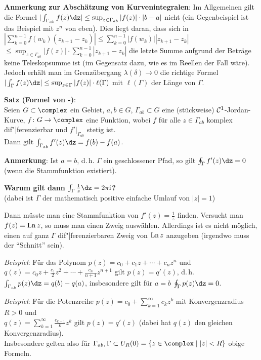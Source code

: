 \textbf{Anmerkung zur Abschätzung von Kurvenintegralen}:
Im Allgemeinen gilt die Formel
$|\int_{\Gamma_{ab}} f(z)\dz| \le \sup_{z \in \Gamma_{ab}} |f(z)| \cdot |b - a|$
nicht
(ein Gegenbeispiel ist das Beispiel mit $z^n$ von eben).
Dies liegt daran, dass sich in
$|\sum_{k=0}^{n-1} f(w_k) (z_{k+1} - z_k)|
\le \sum_{k=0}^{n-1} |f(w_k)| |z_{k+1} - z_k|$\\
$\le \sup_{z \in \Gamma_{ab}} |f(z)| \cdot \sum_{k=0}^{n-1} |z_{k+1} - z_k|$
die letzte Summe aufgrund der Beträge keine Teleskopsumme ist
(im Gegensatz dazu, wie es im Reellen der Fall wäre).
Jedoch erhält man im Grenzübergang $\lambda(\delta) \to 0$ die richtige Formel
$|\int_\Gamma f(z)\dz| \le \sup_{z \in \Gamma} |f(z)| \cdot \ell(\Gamma)$
mit $\ell(\Gamma)$ der Länge von $\Gamma$.

\linie

\textbf{Satz (Formel von -)}:\\
Seien $G \subset \complex$ ein Gebiet,
$a, b \in G$, $\Gamma_{ab} \subset G$ eine (stückweise) $\mathcal{C}^1$-Jordan-Kurve,
$f\colon G \rightarrow \complex$ eine Funktion, wobei
$f$ für alle $z \in \Gamma_{ab}$ komplex dif"|ferenzierbar und
$f'|_{\Gamma_{ab}}$ stetig ist.\\
Dann gilt $\int_{\Gamma_{ab}} f'(z) \dz = f(b) - f(a)$.

\textbf{Anmerkung}:
Ist $a = b$, d.\,h. $\Gamma$ ein geschlossener Pfad, so gilt
$\oint_\Gamma f'(z)\dz = 0$\\
(wenn die Stammfunktion existiert).

\linie
\pagebreak

\textbf{Warum gilt dann $\int_\Gamma \frac{1}{z} \dz = 2\pi\i$?}\\
(dabei ist $\Gamma$ der mathematisch positive einfache Umlauf von $|z| = 1$)

Dann müsste man eine Stammfunktion von $f'(z) = \frac{1}{z}$ finden.
Versucht man $f(z) = \operatorname{Ln} z$, so muss man einen Zweig auswählen.
Allerdings ist es nicht möglich, einen auf ganz $\Gamma$ dif"|ferenzierbaren
Zweig von $\operatorname{Ln} z$ anzugeben
(irgendwo muss der "`Schnitt"' sein).

\linie

\emph{Beispiel}:
Für das Polynom $p(z) = c_0 + c_1 z + \dotsb + c_n z^n$ und
$q(z) = c_0 z + \frac{c_1}{2} z^2 + \dotsb + \frac{c_n}{n + 1} z^{n+1}$ gilt
$p(z) = q'(z)$, d.\,h. $\int_{\Gamma_{ab}} p(z)\dz = q(b) - q(a)$, insbesondere
gilt für $a = b$ $\oint_\Gamma p(z)\dz = 0$.

\emph{Beispiel}:
Für die Potenzreihe $p(z) = c_0 + \sum_{k=1}^\infty c_k z^k$ mit
Konvergenzradius $R > 0$ und\\
$q(z) = \sum_{k=1}^\infty \frac{c_{k-1}}{k} z^k$ gilt $p(z) = q'(z)$
(dabei hat $q(z)$ den gleichen Konvergenzradius).\\
Insbesondere gelten also für
$\Gamma_{ab}, \Gamma \subset U_R(0) = \{z \in \complex \;|\; |z| < R\}$
obige Formeln.

